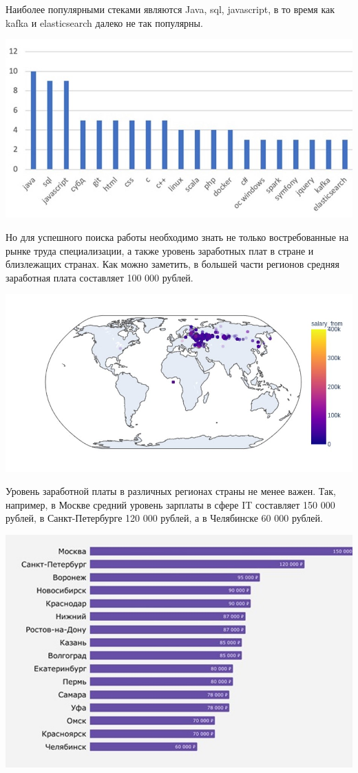 \documentclass{article}
\begin{document}
Наиболее популярными стеками являются Java, sql, javascript, в то время как kafka и elasticsearch далеко не так популярны.

\includegraphics[width=\textwidth]{Images/2.jpg}

Но для успешного поиска работы необходимо знать не только востребованные на рынке труда специализации, а также уровень заработных плат в стране и близлежащих странах. Как можно заметить, в большей части регионов средняя заработная плата составляет 100 000 рублей.

\includegraphics[width=\textwidth]{Images/3.jpg}

Уровень заработной платы в различных регионах страны не менее важен. Так, например, в Москве средний уровень зарплаты в сфере IT составляет 150 000 рублей, в Санкт-Петербурге 120 000 рублей, а в Челябинске 60 000 рублей.

\includegraphics[width=\textwidth]{Images/4.jpg}
\end{document}

